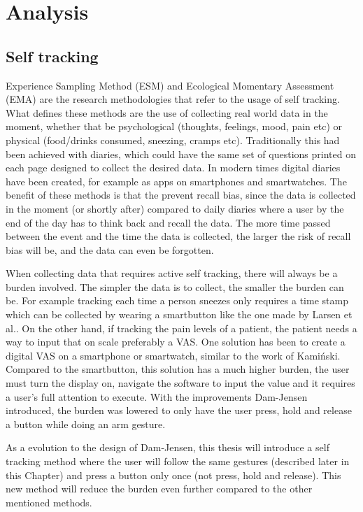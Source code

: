 \chapter{Analysis}\label{anal_ch}

\section{Self tracking}
Experience Sampling Method (ESM) and Ecological Momentary Assessment (EMA) are the research methodologies that refer to the usage of self tracking\cite{esm}. What defines these methods are the use of collecting real world data in the moment, whether that be psychological (thoughts, feelings, mood, pain etc) or physical (food/drinks consumed, sneezing, cramps etc). Traditionally this had been achieved with diaries, which could have the same set of questions printed on each page designed to collect the desired data. In modern times digital diaries have been created, for example as apps on smartphones and smartwatches. The benefit of these methods is that the prevent recall bias, since the data is collected in the moment (or shortly after) compared to daily diaries where a user by the end of the day has to think back and recall the data. The more time passed between the event and the time the data is collected, the larger the risk of recall bias will be, and the data can even be forgotten.

When collecting data that requires active self tracking, there will always be a burden involved. The simpler the data is to collect, the smaller the burden can be. For example tracking each time a person sneezes only requires a time stamp which can be collected by wearing a smartbutton like the one made by Larsen et al.\cite{eg}. On the other hand, if tracking the pain levels of a patient, the patient needs a way to input that on scale preferably a VAS. One solution has been to create a digital VAS on a smartphone or smartwatch, similar to the work of Kami\'nski\cite{tomas}. Compared to the smartbutton, this solution has a much higher burden, the user must turn the display on, navigate the software to input the value and it requires a user's full attention to execute. With the improvements Dam-Jensen\cite{dam} introduced, the burden was lowered to only have the user press, hold and release a button while doing an arm gesture.

As a evolution to the design of Dam-Jensen\cite{dam}, this thesis will introduce a self tracking method where the user will follow the same gestures (described later in this Chapter) and press a button only once (not press, hold and release). This new method will reduce the burden even further compared to the other mentioned methods.










